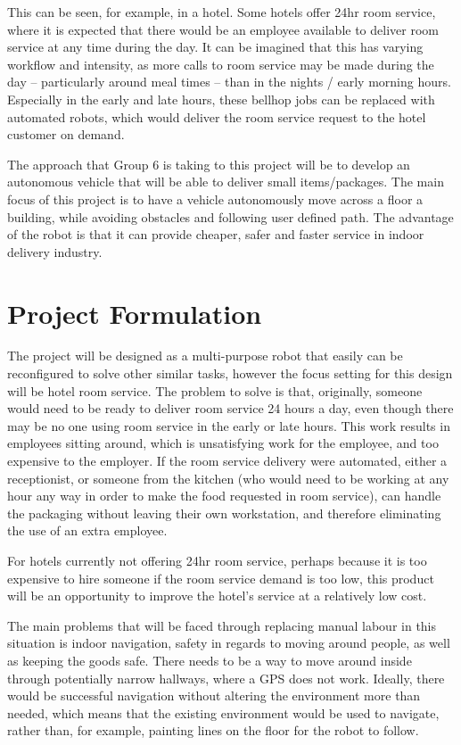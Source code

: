 \documentclass[11pt]{article}
\begin{document}
This can be seen, for example, in a hotel. Some hotels offer 24hr room service, where it is expected that there would be an employee available to deliver room service at any time during the day. It can be imagined that this has varying workflow and intensity, as more calls to room service may be made during the day – particularly around meal times – than in the nights / early morning hours. Especially in the early and late hours, these bellhop jobs can be replaced with automated robots, which would deliver the room service request to the hotel customer on demand.


The approach that Group 6 is taking to this project will be to develop an autonomous vehicle that will be able to deliver small items/packages. The main focus of this project is to have a vehicle autonomously move across a floor a building, while avoiding obstacles and following user defined path.  The advantage of the robot is that it can provide cheaper, safer and faster service in indoor delivery industry.

\newpage
\section{Project Formulation}
The project will be designed as a multi-purpose robot that easily can be reconfigured to solve other similar tasks, however the focus setting for this design will be hotel room service. The problem to solve is that, originally, someone would need to be ready to deliver room service 24 hours a day, even though there may be no one using room service in the early or late hours. This work results in employees sitting around, which is unsatisfying work for the employee, and too expensive to the employer. If the room service delivery were automated, either a receptionist, or someone from the kitchen (who would need to be working at any hour any way in order to make the food requested in room service), can handle the packaging without leaving their own workstation, and therefore eliminating the use of an extra employee.


For hotels currently not offering 24hr room service, perhaps because it is too expensive to hire someone if the room service demand is too low, this product will be an opportunity to improve the hotel’s service at a relatively low cost.


The main problems that will be faced through replacing manual labour in this situation is indoor navigation, safety in regards to moving around people, as well as keeping the goods safe. There needs to be a way to move around inside through potentially narrow hallways, where a GPS does not work. Ideally, there would be successful navigation without altering the environment more than needed, which means that the existing environment would be used to navigate, rather than, for example, painting lines on the floor for the robot to follow.
\end{document}
